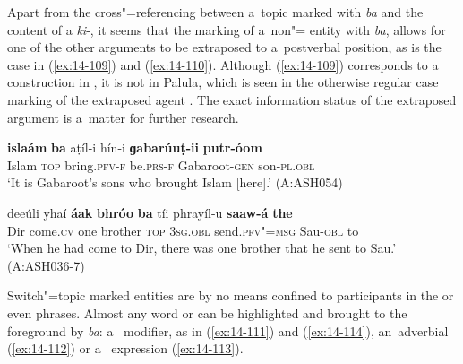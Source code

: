 Apart from the cross"=referencing between a~topic marked with \textit{ba} and the content of a \textit{ki}-, it seems that the marking of a~non"= entity with \textit{ba}, allows for one of the other arguments to be extraposed to a~postverbal position, as is the case in (\ref{ex:14-109}) and (\ref{ex:14-110}). Although (\ref{ex:14-109}) corresponds to a~ construction in \iliEnglish, it is not  in Palula, which is seen in the otherwise regular  case marking of the extraposed agent . The exact information status of the extraposed argument is a~matter for further research.

\begin{exe}
\ex
\label{ex:14-109}
\gll \textbf{islaám} \textbf{ba} aṭíl-i hín-i \textbf{ɡabarúuṭ-ii} \textbf{putr-óom}\\
Islam \textsc{top} bring.\textsc{pfv-f} be.\textsc{prs-f} Gabaroot-\textsc{gen} son-\textsc{pl.obl }\\
\glt `It is Gabaroot's sons who brought Islam [here].' (A:ASH054)

\ex
\label{ex:14-110}
\gll deeúli yhaí \textbf{áak} \textbf{bhróo} \textbf{ba} tíi phrayíl-u \textbf{saaw-á} \textbf{the}\\
Dir come.\textsc{cv} one brother \textsc{top} \textsc{3sg.obl} send.\textsc{pfv"=msg} Sau-\textsc{obl} to\\
\glt `When he had come to Dir, there was one brother that he sent to Sau.' (A:ASH036-7)
\end{exe}

Switch"=topic marked entities are by no means confined to participants in the  or even  phrases. Almost any word or  can be highlighted and brought to the foreground by \textit{ba}: a~ modifier, as in (\ref{ex:14-111}) and (\ref{ex:14-114}), an~adverbial (\ref{ex:14-112}) or a~ expression (\ref{ex:14-113}). 

